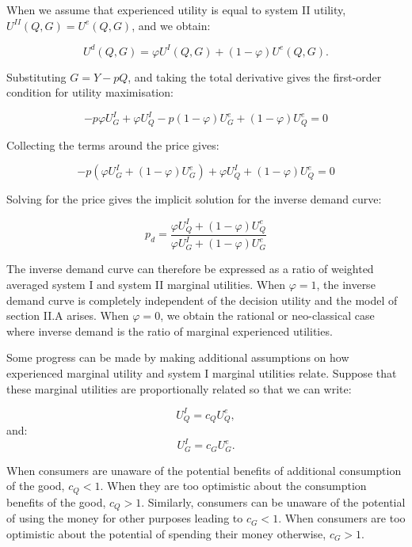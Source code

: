\documentclass[
]{book}
\begin{document}
When we assume that experienced utility is equal to system II utility, \(U^{II} (Q,G)=U^e (Q,G)\), and we obtain:

\begin{equation}
U^d (Q,G)= \varphi U^I (Q, G) + (1 - \varphi) U^e (Q, G).
\end{equation}

Substituting \(G=Y-pQ\), and taking the total derivative gives the first-order condition for utility maximisation:

\begin{equation}
-p \varphi U_G^I + \varphi U_Q^I - p (1 - \varphi) U^e_G +  (1 - \varphi) U^e_Q = 0 \end{equation}

Collecting the terms around the price gives:

\begin{equation}
-p (\varphi U_G^I + (1 - \varphi) U^e_G) +  \varphi U_Q^I + (1 - \varphi) U^e_Q = 0 \end{equation}

Solving for the price gives the implicit solution for the inverse demand curve:

\begin{equation}
p_d = \frac{ \varphi U_Q^I + (1 - \varphi) U^e_Q }{\varphi U_G^I + (1 - \varphi) U^e_G}
\end{equation}

The inverse demand curve can therefore be expressed as a ratio of weighted averaged system I and system II marginal utilities. When \(\varphi =1\), the inverse demand curve is completely independent of the decision utility and the model of section II.A arises. When \(\varphi=0\), we obtain the rational or neo-classical case where inverse demand is the ratio of marginal experienced utilities.

Some progress can be made by making additional assumptions on how experienced marginal utility and system I marginal utilities relate. Suppose that these marginal utilities are proportionally related so that we can write:

\begin{equation}
U^I_Q = c_Q U^e_Q,
\label{eq:uiq}
\end{equation}
and:
\begin{equation}
U^I_G = c_G U^e_G.
\label{eq:uig}
\end{equation}

When consumers are unaware of the potential benefits of additional consumption of the good, \(c_Q<1\). When they are too optimistic about the consumption benefits of the good, \(c_Q>1\). Similarly, consumers can be unaware of the potential of using the money for other purposes leading to \(c_G<1\). When consumers are too optimistic about the potential of spending their money otherwise, \(c_G>1\).
\end{document}

